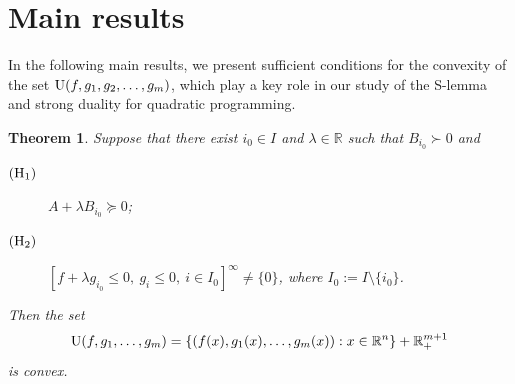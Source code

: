 \documentclass[]{interact}
\theoremstyle{plain}%
\newtheorem{theorem}{Theorem}[section]
\theoremstyle{definition}
\theoremstyle{remark}
\begin{document}
	
	\section{Main results}
	
	
	In the following main results, we present sufficient conditions for the convexity of the set
	${\rm U}(f,g_1,g_2,\ldots,g_m)$, which play a key role in our study of the S-lemma
	and strong duality for quadratic programming.
	\begin{theorem}\label{Theo3} 
		Suppose that there exist $i_0\in I$ and $\lambda\in \mathbb{R}$ such that $B_{i_0}\succ 0$ and
		\begin{description}
			\item[${\rm (H_1)}$] $A+\lambda B_{i_0}\succeq 0$;
			\item[${\rm (H_2)}$] $[f+\lambda g_{i_0}\leq 0,\ g_i\leq 0,\ i\in I_0]^\infty \neq \{0\}$,
			where $I_0:=I\setminus \{i_0\}$.
		\end{description}	 
		Then the set
		$$
		{\rm U}(f,g_1,\ldots,g_m)
		=\{(f(x), g_1(x), \ldots, g_m(x)) : x\in \mathbb{R}^n\}+\mathbb{R}^{m+1}_+
		$$
		is convex.                    
	\end{theorem}
	
\end{document}
